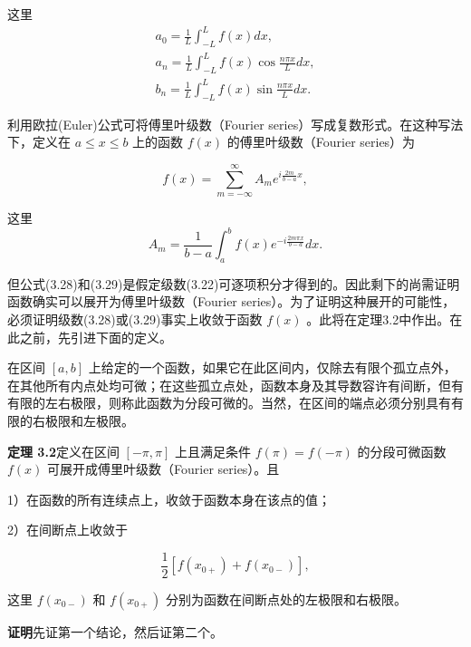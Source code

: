 这里
\begin{equation*}
\begin{array}{l} a _ {0} = \frac {1}{L} \int_ {- L} ^ {L} f (x) d x, \\ a _ {n} = \frac {1}{L} \int_ {- L} ^ {L} f (x) \cos \frac {n \pi x}{L} d x, \\ b _ {n} = \frac {1}{L} \int_ {- L} ^ {L} f (x) \sin \frac {n \pi x}{L} d x. \end{array}\tag{3.28b}
\end{equation*}

利用欧拉(Euler)公式可将傅里叶级数（Fourier series）写成复数形式。在这种写法下，定义在 $a \leqslant x \leqslant b$ 上的函数 $f(x)$ 的傅里叶级数（Fourier series）为

\begin{equation*}
f (x) = \sum_ {m = - \infty} ^ {\infty} A _ {m} e ^ {i \frac {2 m}{b - a} x},\tag{3.29a}
\end{equation*}

这里
\begin{equation*}
A _ {m} = \frac {1}{b - a} \int_ {a} ^ {b} f (x) e ^ {- i \frac {2 m \pi x}{b - a}} d x.\tag{3.29b}
\end{equation*}

但公式(3.28)和(3.29)是假定级数(3.22)可逐项积分才得到的。因此剩下的尚需证明函数确实可以展开为傅里叶级数（Fourier series）。为了证明这种展开的可能性，必须证明级数(3.28)或(3.29)事实上收敛于函数 $f(x)$ 。此将在定理3.2中作出。在此之前，先引进下面的定义。

在区间 $[a, b]$ 上给定的一个函数，如果它在此区间内，仅除去有限个孤立点外，在其他所有内点处均可微；在这些孤立点处，函数本身及其导数容许有间断，但有有限的左右极限，则称此函数为分段可微的。当然，在区间的端点必须分别具有有限的右极限和左极限。

\textbf{定理 3.2}\quad 定义在区间 $[- \pi, \pi]$ 上且满足条件 $f(\pi) = f(-\pi)$ 的分段可微函数 $f(x)$ 可展开成傅里叶级数（Fourier series）。且

1）在函数的所有连续点上，收敛于函数本身在该点的值；

2）在间断点上收敛于

\begin{equation*}
\frac {1}{2} \left[ f (x _ {0 +}) + f (x _ {0 -}) \right],
\end{equation*}

这里 $f(x_{0-})$ 和 $f(x_{0+})$ 分别为函数在间断点处的左极限和右极限。

\textbf{证明}\quad 先证第一个结论，然后证第二个。


